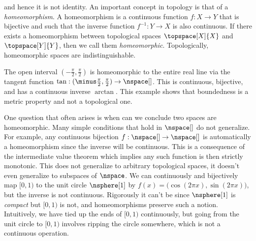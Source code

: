 \documentclass{book}                                                           %
\begin{document}
                and hence it is not identity.
                An important concept in topology is that of a
                \textit{homeomorphism}. A homeomorphism is a continuous function
                $f:X\rightarrow{Y}$ that is bijective and such that the inverse
                function $f^{\minus{1}}:Y\rightarrow{X}$ is also continuous.
                If there exists a homeomorphism between topological spaces
                $\topspace[X]{X}$ and $\topspace[Y]{Y}$, then we call them
                \textit{homeomorphic}. Topologically, homeomorphic spaces are
                indistinguishable.
                \begin{example}
                    The open interval $(\minus\frac{\pi}{2},\frac{\pi}{2})$ is
                    homeomorphic to the entire real line via the tangent
                    function $\tan:(\minus\frac{\pi}{2},\frac{\pi}{2})%
                    \rightarrow\nspace[]$. This is continuous, bijective, and
                    has a continuous inverse $\arctan$. This example shows that
                    boundedness is a metric property and not a topological one.
                \end{example}
                One question that often arises is when can we conclude two
                spaces are homeomorphic. Many simple conditions that hold in
                $\nspace[]$ do not generalize. For example, any continuous
                bijection $f:\nspace[]\rightarrow\nspace[]$ is automatically a
                homeomorphism since the inverse will be continuous. This is a
                consequence of the intermediate value theorem which implies any
                such function is then strictly monotonic. This does not
                generalize to arbitrary topological spaces, it doesn't even
                generalize to subspaces of $\nspace$. We can continuously and
                bijectively map $[0,1)$ to the unit circle $\nsphere[1]$ by
                $f(x)=\big(\cos(2\pi{x}),\sin(2\pi{x})\big)$, but the inverse is
                not continuous. Rigorously it can't be since $\nsphere[1]$ is
                \textit{compact} but $[0,1)$ is not, and homeomorphisms preserve
                such a notion. Intuitively, we have tied up the ends of $[0,1)$
                continuously, but going from the unit circle to $[0,1)$ involves
                ripping the circle somewhere, which is not a continuous
                operation.
                \par\hfill\par
\end{document}
